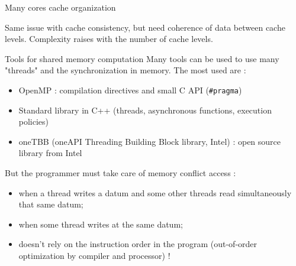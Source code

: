 \documentclass[compress,10pt,aspectratio=169]{beamer}
\begin{document}
\begin{frame}[fragile]{Many cores cache organization}
\begin{center}
        \end{center}
        
        Same issue with cache consistency, but need coherence of data between cache levels. Complexity raises with the number of 
        cache levels.
        
        \end{frame}


\begin{frame}[fragile]{Tools for shared memory computation}
\small
Many tools can be used to use many "threads" and the synchronization in memory. The most used are :

\begin{itemize}
  \item OpenMP : compilation directives and small C API (\texttt{#pragma})
  \item Standard library in C++ (threads, asynchronous functions, execution policies)
  \item oneTBB (oneAPI Threading Building Block library, Intel) : open source library from Intel
  \end{itemize}
 
But the programmer must take care of memory conflict access :
\begin{itemize}
    \item when a thread writes a datum and some other threads read simultaneously that same datum;
    \item when some thread writes at the same datum;
    \item doesn't rely on the instruction order in the program (out-of-order optimization by compiler and processor) !
\end{itemize}
\end{frame}
\end{document}

